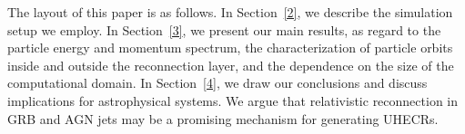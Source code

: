 \documentclass[twocolumn,twocolappendix]{aastex63}
\begin{document}

The layout of this paper is as follows. In Section~\ref{2}, we describe the simulation setup  we employ. In Section~\ref{3}, we present our main results, as regard to the particle energy and momentum spectrum, the characterization of particle orbits inside and outside the reconnection layer, and the dependence on the size of the computational domain. 
In Section~\ref{4}, we draw our conclusions and discuss implications for astrophysical systems.
We argue that relativistic reconnection in GRB and AGN jets may be a promising mechanism for generating UHECRs.


\end{document}

